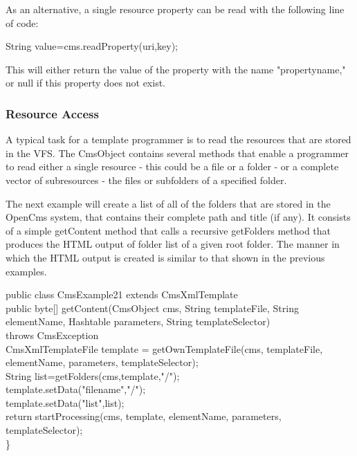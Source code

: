 As an alternative, a single resource property can be read with the
following line of code:

{\code String value=cms.readProperty(uri,key);}

This will either return the value of the property with the name
"propertyname," or null if this property does not exist.

\subsubsection{Resource Access}
A typical task for a template programmer is to read the resources that
are stored in the VFS. The CmsObject contains several methods that
enable a programmer to read either a single resource - this could be a
file or a folder - or a complete vector of subresources - the files or
subfolders of a specified folder.

The next example will create a list of all of the folders that are
stored in the OpenCms system, that contains their complete path and
title (if any). It consists of a simple {\meth getContent} method that calls a
recursive {\meth getFolders} method that produces the HTML output of folder
list of a given root folder. The manner in which the HTML output is
created is similar to that shown in the previous examples.

\begin{java}
public class CmsExample21 extends CmsXmlTemplate\\ 
public byte[] getContent(CmsObject cms, String templateFile, String\\
elementName, Hashtable parameters, String templateSelector)\\
throws CmsException\\ 
CmsXmlTemplateFile template = getOwnTemplateFile(cms, templateFile,\\
elementName, parameters, templateSelector);\\
\jtabc        String list=getFolders(cms,template,"/");\\
\jtabc        template.setData("filename","/");\\
\jtabc        template.setData("list",list);\\

return startProcessing(cms, template, elementName, parameters,\\
templateSelector);\\
\}\\
\end{java}

